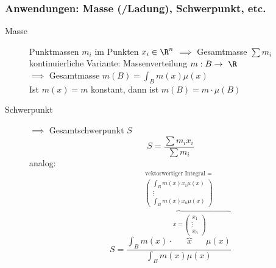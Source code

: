 \subsubsection{Anwendungen: Masse (/Ladung), Schwerpunkt, etc.}
\begin{description}
	\item[Masse]
		Punktmassen $m_i$ im Punkten $x_i \in \R^n$ $\implies$ Gesamtmasse $\sum m_i$ \\
		kontinuierliche Variante: Massenverteilung $m: B \rightarrow \R$ \\
		$\implies$ Gesamtmasse $m(B) = \int_B m(x) \mu(x)$ \\
		Ist $m(x) = m$ konstant, dann ist $m(B) = m \cdot \mu(B)$
	\item[Schwerpunkt]
		$\implies$ Gesamtschwerpunkt $S$
		\[ S = \frac{\sum m_i x_i}{\sum m_i} \]
		analog:
		\[ S = \frac{\overbrace{\int_B m(x) \cdot \overbrace{x}^{x = \begin{pmatrix} x_1 \\ \vdots \\ x_n \end{pmatrix}} \mu(x)}^{\substack{\text{vektorwertiger Integral } = \\ \begin{pmatrix} \int_B m(x) x_1 \mu(x) \\ \vdots \\ \int_B m(x) x_n \mu(x) \end{pmatrix}}}}{\int_B m(x) \mu(x)} \]
\end{description}

